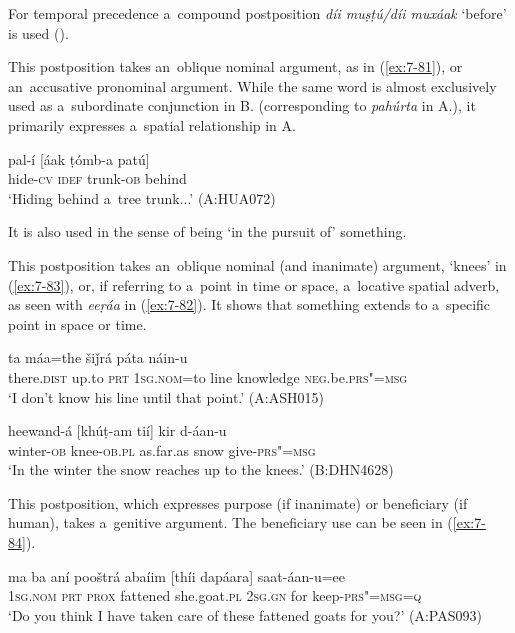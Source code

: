 For temporal precedence a~compound postposition \textit{díi muṣṭú/díi muxáak} `before' is used ().


 This postposition takes an~oblique nominal argument, as in (\ref{ex:7-81}), or an~accusative pronominal argument. While the same word is almost exclusively used as a~subordinate conjunction in B. (corresponding to \textit{pahúrta} in A.), it primarily expresses a~spatial relationship in A. 

\begin{exe}
\ex
\label{ex:7-81}
\gll pal-í [áak ṭómb-a patú] \\
hide-\textsc{cv} \textsc{idef} trunk-\textsc{ob} behind \\
\glt `Hiding behind a~tree trunk...' (A:HUA072)
\end{exe}

It is also used in the sense of being `in the pursuit of' something.


 This postposition takes an~oblique nominal (and inanimate) argument, `knees' in (\ref{ex:7-83}), or, if referring to a~point in time or space, a~locative spatial adverb, as seen with \textit{eeṛáa} in (\ref{ex:7-82}). It shows that something extends to a~specific point in space or time. 

\begin{exe}
\ex
\label{ex:7-82}
 ta máa=the šiǰrá páta náin-u \\
there.\textsc{dist} up.to \textsc{prt} \textsc{1sg.nom}=to line knowledge \textsc{neg}.be.\textsc{prs"=msg} \\
\glt `I don't know his line until that point.' (A:ASH015)
\end{exe}
\begin{exe}
\ex
\label{ex:7-83}
\gll heewand-á [khúṭ-am tií] kir d-áan-u \\
winter-\textsc{ob} knee-\textsc{ob.pl} as.far.as snow give-\textsc{prs"=msg}  \\
\glt `In the winter the snow reaches up to the knees.' (B:DHN4628)
\end{exe}

 This postposition, which expresses purpose (if inanimate) or beneficiary (if human), takes a~genitive argument. The beneficiary use can be seen in (\ref{ex:7-84}).

\begin{exe}
\ex
\label{ex:7-84}
\gll ma ba aní pooštrá abaíim [thíi dapáara] saat-áan-u=ee \\
\textsc{1sg.nom} \textsc{prt} \textsc{prox} fattened she.goat.\textsc{pl} \textsc{2sg.gn} for keep-\textsc{prs"=msg=q} \\
\glt `Do you think I have taken care of these fattened goats for you?' (A:PAS093)
\end{exe}

